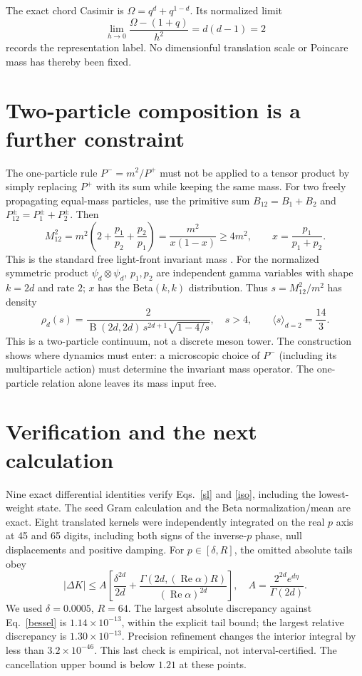 \documentclass[11pt,a4paper]{article}
\begin{document}
The exact chord Casimir is $\Omega=q^d+q^{1-d}$. Its normalized limit
\begin{equation}
 \lim_{h\to0}\frac{\Omega-(1+q)}{h^2}=d(d-1)=2
\end{equation}
records the representation label. No dimensionful translation scale or
Poincare mass has thereby been fixed.

\newpage
\section{Two-particle composition is a further constraint}
The one-particle rule $P^-=m^2/P^+$ must not be applied to a tensor
product by simply replacing $P^+$ with its sum while keeping the same
mass. For two freely propagating equal-mass particles, use the primitive
sum $B_{12}=B_1+B_2$ and $P^\pm_{12}=P^\pm_1+P^\pm_2$. Then
\begin{equation}
 M_{12}^2=m^2\left(2+\frac{p_1}{p_2}+\frac{p_2}{p_1}\right)
 =\frac{m^2}{x(1-x)}\ge4m^2,\qquad x=\frac{p_1}{p_1+p_2}.
\end{equation}
This is the standard free light-front invariant mass \cite{pauli}.
For the normalized symmetric product $\psi_d\otimes\psi_d$, $p_1,p_2$
are independent gamma variables with shape $k=2d$ and rate $2$;
$x$ has the Beta$(k,k)$ distribution. Thus $s=M_{12}^2/m^2$ has density
\begin{equation}
 \rho_d(s)=\frac{2}{\operatorname B(2d,2d)\,s^{2d+1}\sqrt{1-4/s}},
 \quad s>4,\qquad
 \langle s\rangle_{d=2}=\frac{14}{3}.\label{density}
\end{equation}
This is a two-particle continuum, not a discrete meson tower. The
construction shows where dynamics must enter: a microscopic choice of
$P^-$ (including its multiparticle action) must determine the invariant
mass operator. The one-particle relation alone leaves its mass input free.

\section{Verification and the next calculation}
Nine exact differential identities verify Eqs.~\eqref{sl} and
\eqref{iso}, including the lowest-weight state. The seed Gram calculation
and the Beta normalization/mean are exact. Eight translated kernels
were independently integrated on the real $p$ axis at 45 and 65 digits,
including both signs of the inverse-$p$ phase, null displacements and
positive damping. For $p\in[\delta,R]$, the omitted absolute tails obey
\begin{equation}
 |\Delta K|\le A\left[\frac{\delta^{2d}}{2d}
 +\frac{\Gamma(2d,(\operatorname{Re}\alpha)R)}
 {(\operatorname{Re}\alpha)^{2d}}\right],\quad
 A=\frac{2^{2d}e^{d\eta}}{\Gamma(2d)}.
\end{equation}
We used $\delta=0.0005$, $R=64$. The largest absolute discrepancy
against Eq.~\eqref{bessel} is $1.14\times10^{-13}$, within the explicit
tail bound; the largest relative discrepancy is $1.30\times10^{-13}$.
Precision refinement changes the interior integral by less than
$3.2\times10^{-46}$. This last check is empirical, not interval-certified.
The cancellation upper bound is below $1.21$ at these points.
\end{document}
